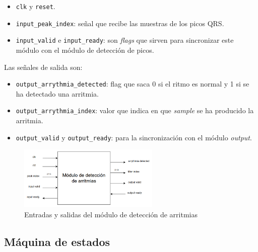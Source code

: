 \begin{itemize}
    \item \texttt{clk} y \texttt{reset}.
    \item \texttt{input\_peak\_index}: señal que recibe las muestras de los picos QRS.
    \item \texttt{input\_valid} e \texttt{input\_ready}: son \textit{flags} que sirven para sincronizar este módulo con el módulo de detección de picos. 
\end{itemize}
    
Las señales de salida son:

\begin{itemize}
    \item \texttt{output\_arrythmia\_detected}: flag que saca 0 si el ritmo es normal y 1 si se ha detectado una arritmia.
    \item \texttt{output\_arrythmia\_index}: valor que indica en que \textit{sample} se ha producido la arritmia.
    \item \texttt{output\_valid} y \texttt{output\_ready}: para la sincronización con el módulo \textit{output}.
\end{itemize}

\begin{figure}[h!]
    \centering
    \includegraphics[width=0.6\textwidth]{./Images/img_implementacion_hw/diagramamodulodeteccionarritmias.png}
    \caption{Entradas y salidas del módulo de detección de arritmias}
    \label{fig:moddeteccionarritmias}
\end{figure} 

\subsection{Máquina de estados}


